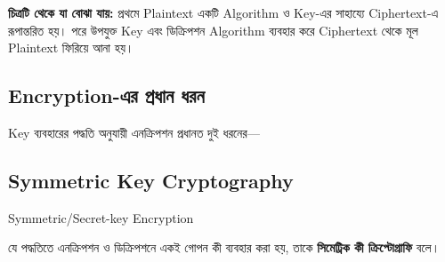 \noindent
\textbf{চিত্রটি থেকে যা বোঝা যায়:}
প্রথমে Plaintext একটি Algorithm ও Key-এর সাহায্যে Ciphertext-এ
রূপান্তরিত হয়। পরে উপযুক্ত Key এবং ডিক্রিপশন Algorithm ব্যবহার
করে Ciphertext থেকে মূল Plaintext ফিরিয়ে আনা হয়।



\subsection{Encryption-এর প্রধান ধরন}

Key ব্যবহারের পদ্ধতি অনুযায়ী এনক্রিপশন প্রধানত দুই ধরনের---

\begin{flushleft}
\begin{minipage}{0.88\linewidth}
\raggedright
\small



\end{minipage}
\end{flushleft}



\subsection{Symmetric Key Cryptography}

\begin{definitionbox}{Symmetric/Secret-key Encryption}

যে পদ্ধতিতে এনক্রিপশন ও ডিক্রিপশনে একই গোপন কী ব্যবহার করা হয়, তাকে \textbf{সিমেট্রিক কী ক্রিপ্টোগ্রাফি} বলে।

\end{definitionbox}


